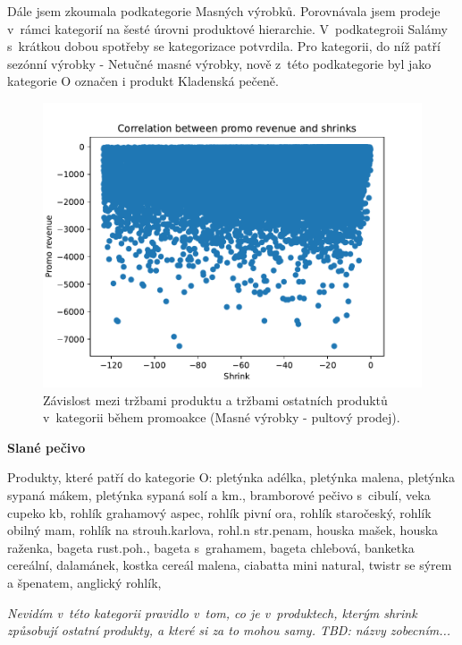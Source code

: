 Dále jsem zkoumala podkategorie Masných výrobků. Porovnávala jsem prodeje v~rámci kategorií na šesté úrovni produktové hierarchie. V~podkategroii Salámy s~krátkou dobou spotřeby se kategorizace potvrdila. Pro kategorii, do níž patří sezónní výrobky - Netučné masné výrobky, nově z~této podkategorie byl jako kategorie O označen i produkt Kladenská pečeně.

\begin{figure}[hbtp!]
    \centering
    \captionsetup{justification=centering}
    \includegraphics[width=\textwidth]{obrazky/grafy/categorization_charts/categorization_charts_L4_PROC. MEAT SERVICE.pdf}
    \caption{Závislost mezi tržbami produktu a tržbami ostatních produktů v~kategorii během promoakce (Masné výrobky - pultový prodej).}
    \label{obr:ctg:g:graf}
\end{figure}

\textbf{Slané pečivo}

Produkty, které patří do kategorie O:
pletýnka adélka, pletýnka malena, pletýnka sypaná mákem, pletýnka sypaná solí a km., bramborové pečivo s~cibulí, veka cupeko kb, rohlík grahamový aspec, rohlík pivní ora, rohlík staročeský, rohlík obilný mam, rohlík na strouh.karlova, rohl.n str.penam, houska mašek, houska raženka, bageta rust.poh., bageta s~grahamem, bageta chlebová, banketka cereální, dalamánek, kostka cereál malena, ciabatta mini natural, twistr se sýrem a špenatem, anglický rohlík, 

\emph{Nevidím v~této kategorii pravidlo v~tom, co je v~produktech, kterým shrink způsobují ostatní produkty, a které si za to mohou samy. TBD: názvy zobecním...}

